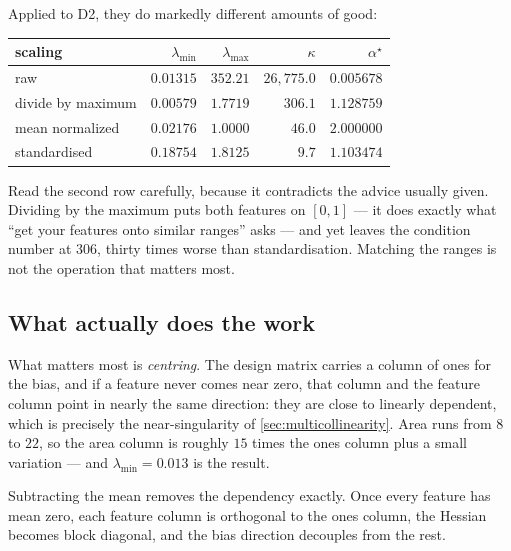 Applied to D2, they do markedly different amounts of good:

\begin{center}
\small
\renewcommand{\arraystretch}{1.2}
\begin{tabular}{@{}lrrrr@{}}
\toprule
scaling & $\lambda_{\min}$ & $\lambda_{\max}$ & $\kappa$ & $\alpha^\star$\\
\midrule
raw                & $0.01315$ & $352.21$ & $26{,}775.0$ & $0.005678$\\
divide by maximum  & $0.00579$ & $1.7719$ & $306.1$      & $1.128759$\\
mean normalized    & $0.02176$ & $1.0000$ & $46.0$       & $2.000000$\\
standardised       & $0.18754$ & $1.8125$ & $9.7$        & $1.103474$\\
\bottomrule
\end{tabular}
\end{center}

Read the second row carefully, because it contradicts the advice usually given.
Dividing by the maximum puts both features on $[0,1]$ --- it does exactly what
``get your features onto similar ranges'' asks --- and yet leaves the condition
number at $306$, thirty times worse than standardisation. Matching the ranges is
not the operation that matters most.

\subsection{What actually does the work}

What matters most is \emph{centring}. The design matrix carries a column of ones
for the bias, and if a feature never comes near zero, that column and the feature
column point in nearly the same direction: they are close to linearly dependent,
which is precisely the near-singularity of \cref{sec:multicollinearity}. Area
runs from $8$ to $22$, so the area column is roughly $15$ times the ones column
plus a small variation --- and $\lambda_{\min} = 0.013$ is the result.

Subtracting the mean removes the dependency exactly. Once every feature has mean
zero, each feature column is orthogonal to the ones column, the Hessian becomes
block diagonal, and the bias direction decouples from the rest.

